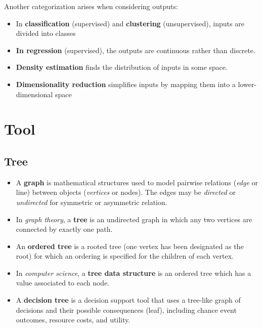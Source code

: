 \documentclass[twocolumn]{article}
\numberwithin{equation}{section}
\begin{document}
 
Another categorization arises when considering outputs:
\begin{itemize}
	\item In \textbf{classification} (supervised) and \textbf{clustering} (unsupervised), inputs are divided into classes
	\item \textbf{In regression} (supervised), the outputs are continuous rather than discrete.
	\item \textbf{Density estimation} finds the distribution of inputs in some space.
	\item \textbf{Dimensionality reduction} simplifies inputs by mapping them into a lower-dimensional space
\end{itemize}




















\newpage
\section{Tool}

	\subsection{Tree}
\begin{itemize}
	\item A \textbf{graph} is mathematical structures used to model pairwise relations (\textit{edge} or line) between objects (\textit{vertices} or nodes). The edges may be \textit{directed} or \textit{undirected} for symmetric or asymmetric relation.

	\item In \textit{graph theory}, a \textbf{tree} is an undirected graph in which any two vertices are connected by exactly one path.

	\item An \textbf{ordered tree} is a rooted tree (one vertex has been designated as the root) for which an ordering is specified for the children of each vertex.

	\item In \textit{computer science}, a \textbf{tree data structure} is an ordered tree which has a value associated to each node.
	
	\item A \textbf{decision tree} is a decision support tool that uses a tree-like graph of decisions and their possible consequences (leaf), including chance event outcomes, resource costs, and utility. 
\end{itemize}
\end{document}
